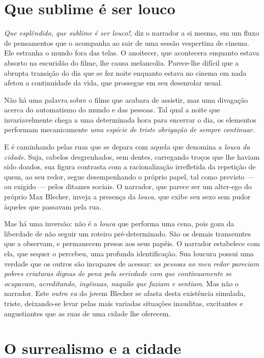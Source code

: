 \section{Que sublime é ser louco}

\textit{Que esplêndido, que sublime é ser louco!}, diz o narrador a si mesmo, em um fluxo de pensamentos que o acompanha ao sair de uma sessão vespertina de cinema. Ele estranha o mundo fora das telas. O anoitecer, que acontecera enquanto estava absorto na escuridão do filme, lhe causa melancolia. Parece-lhe difícil que a abrupta transição do dia que se fez noite enquanto estava no cinema em nada afetou a continuidade da vida, que prossegue em seu desenrolar usual.

Não há uma palavra sobre o filme que acabara de assistir, mas uma divagação acerca do automatismo do mundo e das pessoas. Tal qual a noite que invariavelmente chega a uma determinada hora para encerrar o dia, os elementos performam mecanicamente \textit{uma espécie de triste obrigação de sempre continuar}.

E é caminhando pelas ruas que se depara com aquela que denomina a \textit{louca da cidade}. Suja, cabelos desgrenhados, sem dentes, carregando troços que lhe haviam sido doados, sua figura contrasta com a racionalização irrefletida da repetição de quem, ao seu redor, segue desempenhando o próprio papel, tal como previsto --- ou exigido --- pelos ditames sociais. O narrador, que parece ser um alter-ego do próprio Max Blecher, inveja a presença da \textit{louca}, que exibe seu sexo sem pudor àqueles que passavam pela rua.

Mas há uma inversão: não é a \textit{louca} que performa uma cena, pois goza da liberdade de não seguir um roteiro pré-determinado. São os demais transeuntes que a observam, e permanecem presos aos seus papéis. O narrador estabelece com ela, que sequer o percebeu, uma profunda identificação. Sua loucura possui uma verdade que os outros são incapazes de acessar: \textit{as pessoas ao meu redor pareciam pobres criaturas dignas de pena pela seriedade com que continuamente se ocupavam, acreditando, ingênuas, naquilo que faziam e sentiam}. Mas não o narrador. Este \textit{outro eu} do jovem Blecher se afasta desta existência simulada, triste, deixando-se levar pelas mais variadas situações inauditas, excitantes e angustiantes que as ruas de uma cidade lhe oferecem. 

\section{O surrealismo e a cidade}


